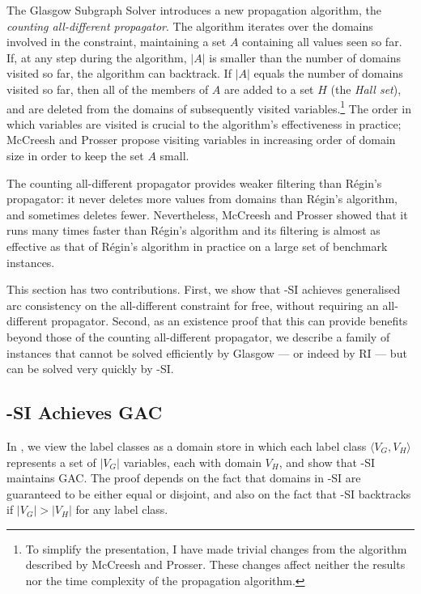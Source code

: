 The Glasgow Subgraph Solver \cite{DBLP:conf/cp/McCreeshP15} introduces a new propagation algorithm,
the \emph{counting all-different propagator}.
The algorithm iterates over the domains involved in the constraint, maintaining a set $A$ containing
all values seen so far.  If, at any step during the algorithm, $|A|$ is smaller than the number
of domains visited so far, the algorithm can backtrack.  If $|A|$ equals the number of domains visited
so far, then all of the members of $A$ are added to a set $H$ (the \emph{Hall set}), and are deleted from
the domains of subsequently visited variables.\footnote{To simplify the presentation,
I have made trivial changes from the algorithm described by McCreesh and Prosser.
These changes affect neither the results nor the time complexity of the propagation algorithm.}
The order in which variables are visited is crucial
to the algorithm's effectiveness in practice; McCreesh and Prosser
propose visiting variables in increasing order of domain size in order to keep the set $A$ small.

The counting all-different propagator provides weaker filtering than
R\'egin's propagator: it never deletes more values from domains than R\'egin's algorithm, and sometimes
deletes fewer. Nevertheless, McCreesh and Prosser showed that it runs many times faster than
R\'egin's algorithm and its filtering is almost as effective as that of R\'egin's algorithm in practice
on a large set of benchmark instances.

This section has two contributions. First, we show that \McSplit-SI achieves generalised arc consistency
on the all-different constraint for free, without requiring an all-different propagator.
Second, as an existence proof that this can provide benefits beyond those of the counting all-different
propagator, we describe
a family of instances that cannot be solved efficiently by Glasgow --- or indeed by RI --- but can
be solved very quickly by \McSplit-SI.

\subsection{\McSplit-SI Achieves GAC}

In , we view the label classes as a domain store in which each label
class $\langle V_G, V_H \rangle$ represents a set of $|V_G|$ variables, each with domain $V_H$,
and show that \McSplit-SI maintains GAC.  The proof depends on the fact that domains in
\McSplit-SI are guaranteed to be
either equal or disjoint, and also on the fact that \McSplit-SI backtracks if $|V_G| > |V_H|$
for any label class.

